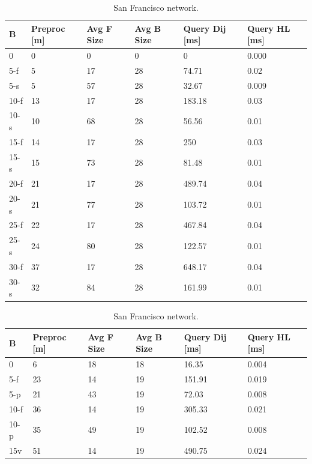 \begin{table}
\begin{subtable}{.5\textwidth}
\begin{center}
\begin{tabular}{ | l | p{1cm} | p{1cm} | p{1cm} | p{1.2cm} | p{1.2cm} | }
\hline
	B & Preproc [m] & Avg F Size & Avg B Size & Query Dij [ms] & Query HL [ms] \\ \hline \hline
	0 & 0 & 0 & 0 & 0 & 0.000 \\ \hline
5-f  & 5  & 17 & 28 & 74.71  & 0.02  \\
5-s  & 5  & 57 & 28 & 32.67  & 0.009 \\\hline
10-f & 13 & 17 & 28 & 183.18 & 0.03  \\
10-s & 10 & 68 & 28 & 56.56  & 0.01  \\\hline
15-f & 14 & 17 & 28 & 250    & 0.03  \\
15-s & 15 & 73 & 28 & 81.48  & 0.01  \\\hline
20-f & 21 & 17 & 28 & 489.74 & 0.04  \\
20-s & 21 & 77 & 28 & 103.72 & 0.01  \\\hline
25-f & 22 & 17 & 28 & 467.84 & 0.04  \\
25-s & 24 & 80 & 28 & 122.57 & 0.01  \\\hline
30-f & 37 & 17 & 28 & 648.17 & 0.04  \\
30-s & 32 & 84 & 28 & 161.99 & 0.01  \\\hline
\end{tabular}
\caption{San Francisco network.}\label{tab:sf_results}
\end{center}
\end{subtable}
\begin{subtable}{.5\textwidth}
\begin{center}
\begin{tabular}{ | l | p{1cm} | p{1cm} | p{1cm} | p{1.2cm} | p{1.2cm} |}
\hline
	B & Preproc  [m] & Avg F Size & Avg B Size & Query Dij [ms] & Query HL [ms] \\ \hline \hline
	0 & 6 & 18 & 18 & 16.35 & 0.004 \\ \hline
	5-f & 23 & 14& 19 & 151.91 & 0.019 \\ 
	5-p & 21 & 43 &19 & 72.03 & 0.008 \\ \hline
	10-f & 36 & 14 & 19 & 305.33 & 0.021 \\ 
10-p & 35 & 49 & 19 & 102.52 & 0.008 \\ \hline
	15v & 51 & 14& 19 & 490.75 & 0.024 \\ 

\end{tabular}
\end{center}
\end{subtable}
\end{table}
